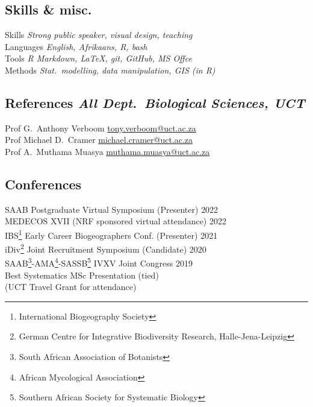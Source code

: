 \documentclass[10pt]{article}
\begin{document}
\begin{multicols}{2}
\subsection*{Skills \& misc.} %

Skills         \hfill \textit{Strong public speaker, visual design, teaching} \\
Languages      \hfill \textit{                   English, Afrikaans, R, bash} \\
Tools          \hfill \textit{      R Markdown, LaTeX, git, GitHub, MS Offce} \\
Methods        \hfill \textit{Stat.~modelling, data manipulation, GIS (in R)}

\subsection*{References %
           \hfill {\small \textmd{\textit{All Dept.~Biological Sciences, UCT}}}}

Prof G.~Anthony Verboom
      \hfill     \href{mailto:tony.verboom@uct.ac.za}{tony.verboom@uct.ac.za} \\
Prof Michael D.~Cramer
      \hfill \href{mailto:michael.cramer@uct.ac.za}{michael.cramer@uct.ac.za} \\
Prof A.~Muthama Muasya
      \hfill \href{mailto:muthama.muasya@uct.ac.za}{muthama.muasya@uct.ac.za} \\

\subsection*{Conferences} %

SAAB Postgraduate Virtual Symposium {\small (Presenter)}  \hfill {\small 2022} \\
MEDECOS XVII                        {\small (NRF sponsored virtual attendance)}
                                                          \hfill {\small 2022} \\
IBS\footnote{
    International Biogeography Society}
  Early Career Biogeographers Conf. {\small (Presenter)}  \hfill {\small 2021} \\
iDiv\footnote{
    German Centre for Integrative Biodiversity Research, Halle-Jena-Leipzig}
  Joint Recruitment Symposium       {\small (Candidate)}  \hfill {\small 2020} \\
SAAB\footnote{
    South African Association of Botanists}-AMA\footnote{
      African Mycological Association}-SASSB\footnote{
        Southern African Society for Systematic Biology}
  IVXV Joint Congress                                     \hfill {\small 2019} \\
  \hspace{2em} {\small Best Systematics MSc Presentation (tied)}               \\
  \hspace{2em} {\small (UCT Travel Grant for attendance)}


\end{multicols}
\end{document}
